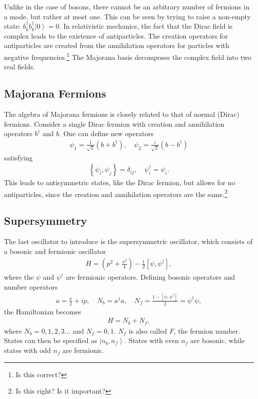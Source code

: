 \documentclass[12pt]{article} %
\renewcommand{\th}[1]{\frac{1}{#1}}
\newcommand{\ket}[1]{\left|#1\right\rangle}
\newcommand{\comm}[2]{\left[#1,#2\right]}
\newcommand{\acom}[2]{\left\{#1,#2\right\}}
\begin{document}
Unlike in the case of bosons, there cannot be an arbitrary number of fermions in a mode, but rather at most one. This can be seen by trying to raise a non-empty state: $b_k^\dag b^\dag_k\ket{0} = 0$. In relativistic mechanics, the fact that the Dirac field is complex leads to the existence of antiparticles. The creation operators for antiparticles are created from the annihilation operators for particles with negative frequencies.\footnote{Is this correct?} The Majorana basis decomposes the complex field into two real fields.

\subsection{Majorana Fermions} \emph{} \label{sub:majorana}

The algebra of Majorana fermions is closely related to that of normal (Dirac) fermions. Consider a single Dirac fermion with creation and annihilation operators $b^\dag$ and $b$. One can define new operators
\begin{align}
\psi_1 = \th{\sqrt{2}}(b+b^\dag ),\quad \psi_2 = \frac{i}{\sqrt{2}}(b-b^\dag)
\end{align}
satisfying
\begin{align}
\acom{\psi_i}{\psi_j} = \delta_{ij},\quad \psi_i^\dag=\psi_i.
\end{align}
This leads to antisymmetric states, like the Dirac fermion, but allows for no antiparticles, since the creation and annihilation operators are the same.\footnote{Is this right? Is it important?} 

\subsection{Supersymmetry} \emph{} \label{sub:susy}

The last oscillator to introduce is the supersymmetric oscillator, which consists of a bosonic and fermionic oscillator
\begin{align}
H = \left(p^2+\frac{x^2}{4}\right) - \th{2}\left[\psi, \psi^\dag\right],
\end{align}
where the $\psi$ and $\psi^\dag$ are fermionic operators. Defining bosonic operators and number operators
\begin{align}
a = \frac{x}{2}+ip,\quad N_b = a^\dag a,\quad N_f = \frac{1-\comm{\psi}{ \psi^\dag}}{2} = \psi^\dag \psi,
\end{align}
the Hamiltonian becomes
\begin{align}
H = N_b + N_f,
\end{align}
where $N_b = 0,1,2,3...$ and $N_f = 0,1$. $N_f$ is also called $F$, the fermion number. States can then be specified as $\ket{n_b,n_f}$. States with even $n_f$ are bosonic, while states with odd $n_f$ are fermionic.
 
\end{document}
